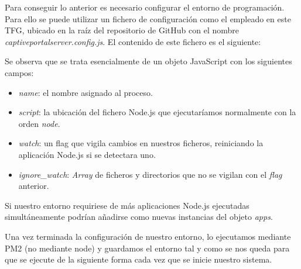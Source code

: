 \begin{appendices}
Para conseguir lo anterior es necesario configurar el entorno de programación. Para ello se puede utilizar un fichero de configuración como el empleado en este TFG, ubicado en la raíz del repositorio de GitHub con el nombre \emph{captiveportalserver.config.js}. El contenido de este fichero es el siguiente:


Se observa que se trata esencialmente de un objeto JavaScript con los siguientes campos:

\begin{itemize}
\item \emph{name}: el nombre asignado al proceso.
\item \emph{script}: la ubicación del fichero Node.js que ejecutaríamos normalmente con la orden \emph{node}.
\item \emph{watch}: un flag que vigila cambios en nuestros ficheros, reiniciando la aplicación Node.js si se detectara uno.
\item \emph{ignore\_watch}: \emph{Array} de ficheros y directorios que no se vigilan con el \emph{flag} anterior.
\end{itemize}

Si nuestro entorno requiriese de más aplicaciones Node.js ejecutadas simultáneamente podrían añadirse como nuevas instancias del objeto \emph{apps}.

Una vez terminada la configuración de nuestro entorno, lo ejecutamos mediante PM2 (no mediante node) y guardamos el entorno tal y como se nos queda para que se ejecute de la siguiente forma cada vez que se inicie nuestro sistema.



\end{appendices}
